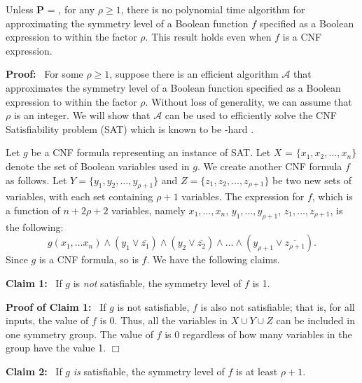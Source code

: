 \newcommand{\cala}{\mbox{$\mathcal{A}$}}

\begin{theorem}\label{thm:approx_sym_level_hard}
Unless \textbf{P} = \cnp,
for any $\rho \geq 1$, there is no polynomial time 
algorithm for approximating the 
symmetry level of a Boolean function $f$ 
specified as a Boolean expression to within the factor $\rho$.
This result holds even when $f$ is a CNF expression.
\end{theorem}

\noindent
\textbf{Proof:}~ For some $\rho \geq 1$, suppose there is an efficient algorithm \cala{} 
that approximates the symmetry level of a Boolean function
specified as a Boolean expression to within the factor $\rho$.
Without loss of generality, we can assume that $\rho$ is an integer.
We will show that \cala{} can be used to efficiently solve
the CNF Satisfiability problem (SAT) which is known 
to be \cnp-hard \citep{GJ-1979}.

Let $g$ be a CNF formula representing an instance of SAT.
Let $X$ = $\{x_1, x_2, \ldots, x_n\}$ denote the set of
Boolean variables used in $g$.
We create another CNF formula $f$ as follows.
Let $Y = \{y_1, y_2, \ldots, y_{\rho+1}\}$ and
$Z = \{z_1, z_2, \ldots, z_{\rho+1}\}$ be two 
new sets of variables, with each set containing $\rho+1$ variables.
The expression for $f$, which is a function of $n+2\rho+2$
variables, namely $x_1, \ldots, x_n$, $y_1, \ldots, y_{\rho+1}$,
$z_1, \ldots, z_{\rho+1}$, is the following:
\[
    g(x_1, \ldots x_n) \wedge (y_1 \vee \overline{z_1}) 
                       \wedge (y_2 \vee \overline{z_2}) 
                       \wedge \ldots \wedge
                              (y_{\rho+1} \vee \overline{z_{\rho+1}}).
\]
Since $g$ is a CNF formula, so is $f$.
We have the following claims.

\medskip

\noindent
\textbf{Claim 1:}~ If $g$ is \emph{not} satisfiable, 
the symmetry level of $f$ is 1.

\smallskip

\noindent
\textbf{Proof of Claim 1:}~ If $g$ is not satisfiable, $f$ is also
not satisfiable; that is, for all inputs, the value of $f$ is 0.
Thus, all the variables in $X \cup Y \cup Z$ can be included in one
symmetry group.
The value of $f$ is 0 regardless of how many variables in the
group have the value 1.  \hfill$\Box$

\medskip

\noindent
\textbf{Claim 2:}~ If $g$ \emph{is} satisfiable, 
the symmetry level of $f$ is at least $\rho+1$.

